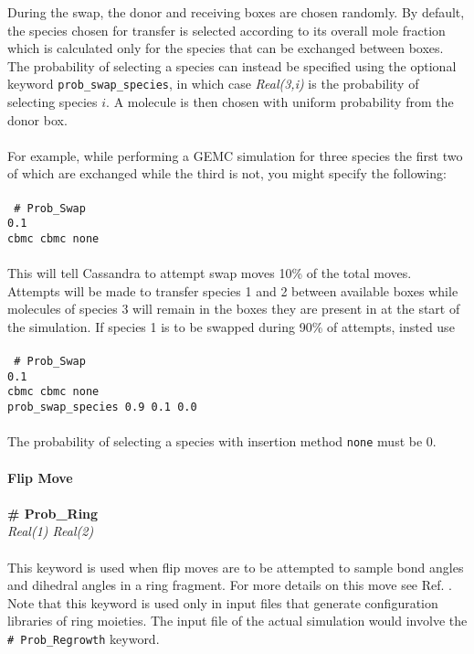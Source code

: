 During the swap, the donor and receiving boxes are chosen randomly. 
By default, the species chosen for transfer is selected according to its overall mole 
fraction which is calculated only for the species that can be exchanged between boxes. 
The probability of selecting a species can instead be specified using the optional keyword 
\texttt{prob\_swap\_species}, in which case {\it Real(3,i)} is the probability of selecting species $i$.
A molecule is then chosen with uniform probability from the donor box. \\ \\
%
For example, while performing a GEMC simulation for three species the first two of which are exchanged
while the third is not, you might specify the following: \\ \\
%
\texttt{ \# Prob\_Swap\\
0.1 \\ 
cbmc cbmc none \\ \\
}
%
This will tell Cassandra to attempt swap moves 10\% of the total moves. 
Attempts will be made to transfer species 1 and 2 between available boxes while molecules of species 3 will remain
in the boxes they are present in at the start of the simulation. 
If species 1 is to be swapped during 90\% of attempts, insted use \\ \\
%
%
\texttt{ \# Prob\_Swap\\
0.1 \\ 
cbmc cbmc none \\
prob\_swap\_species 0.9 0.1 0.0 \\ \\}
%
The probability of selecting a species with insertion method \texttt{none} must be 0. \\ \\
%
%
%
{\bf Flip Move}\\ \\
{\bf \# Prob\_Ring} \\
{\it Real(1) Real(2)} \\ \\
%
This keyword is used when flip moves are to be attempted to sample bond angles and 
dihedral angles in a ring fragment. 
For more details on this move see Ref. \cite{Shah:2011}. 
Note that this keyword is used only in input files
that generate configuration libraries of ring moieties. The input file of the 
actual simulation would involve the \texttt{\# Prob\_Regrowth} keyword.
